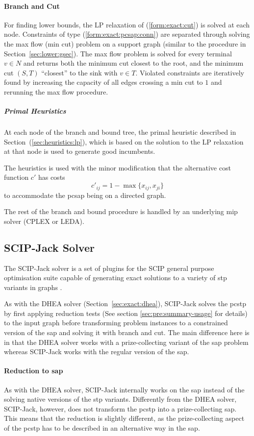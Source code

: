 \paragraph{Branch and Cut}

For finding lower bounds, the LP relaxation of (\ref{form:exact:cut}) is solved at each node.
Constraints of type (\ref{form:exact:pcsap:conn}) are separated through solving the max flow (min cut)
problem on a support graph (similar to the procedure in Section~\ref{sec:lower:gsec}). 
The max flow problem is solved for every terminal $v \in N$ and returns both the minimum cut closest to
the root, and the minimum cut $(S,T)$ ``closest'' to the sink with $v \in T$.
Violated constraints are iteratively found by increasing the
capacity of all edges crossing a min cut to $1$ and rerunning the max flow procedure.

\subparagraph{Primal Heuristics}
At each node of the branch and bound tree, the primal heuristic described in Section~(\ref{sec:heuristics:lp}),
which is based on the solution to the LP relaxation at that node
is used to generate good incumbents.

The heuristics is used with the minor modification that the alternative cost function $c'$ has
costs
\[c'_{ij} = 1 - \max\{x_{ij}, x_{ji} \}\]
to accommodate the \gls{pcsap} being on a directed graph.

The rest of the branch and bound procedure is handled by an underlying \gls{mip} solver (CPLEX or LEDA).
\subsection{SCIP-Jack Solver}
\label{sec:exact:scipj}
The SCIP-Jack solver is a set of plugins for the SCIP general purpose optimisation suite capable
of generating exact solutions to a variety of \gls{stp} variants in graphs \citep{gamrath2017scip}.

As with the DHEA solver (Section~\ref{sec:exact:dhea}), SCIP-Jack solves the \gls{pcstp} by first applying
reduction tests (See section \ref{sec:pre:summary-usage} for details) to the input graph before transforming problem
instances to a constrained version of the \gls{sap} and solving it with branch and cut.
The main difference here is in that the DHEA solver works with a prize-collecting variant
 of the \gls{sap} problem whereas SCIP-Jack works with the regular version of the \gls{sap}.

\paragraph{Reduction to \gls{sap}}
As with the DHEA solver, SCIP-Jack internally works on the \gls{sap} instead of the solving native
versions of the \gls{stp} variants. Differently from the DHEA solver, SCIP-Jack, however, does not
transform the \gls{pcstp} into a prize-collecting \gls{sap}. This means that the reduction is slightly
different, as the prize-collecting aspect of the \gls{pcstp} has to be described in an alternative
way in the \gls{sap}.

